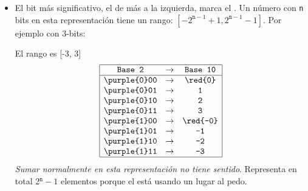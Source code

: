 \begin{itemize}[label=\iconTeoriaUno]
\begin{itemize}[label=\iconTeoriaDos]
          \item \sigMag\par
                El bit más significativo, el de más a la izquierda, marca el .
                Un número con \texttt{n} bits en esta representación tiene un rango: $[-2^{\texttt{n}-1}+1, 2^{\texttt{n}-1} - 1]$.
                Por ejemplo con 3-bits:\par
                El rango es [-3, 3]
                $$
                  \begin{array}{|ccc|}
                    \hline
                    \texttt{Base 2}       & \to & \texttt{Base 10}  \\
                    \hline
                    \texttt{\purple{0}00} & \to & \texttt{\red{0}}  \\
                    \texttt{\purple{0}01} & \to & \texttt{1}        \\
                    \texttt{\purple{0}10} & \to & \texttt{2}        \\
                    \texttt{\purple{0}11} & \to & \texttt{3}        \\
                    \texttt{\purple{1}00} & \to & \texttt{\red{-0}} \\
                    \texttt{\purple{1}01} & \to & \texttt{-1}       \\
                    \texttt{\purple{1}10} & \to & \texttt{-2}       \\
                    \texttt{\purple{1}11} & \to & \texttt{-3}       \\
                    \hline
                  \end{array}
                $$
                \textit{Sumar normalmente en esta representación no tiene sentido}. Representa en total 2$^\texttt{n} - 1$ elementos
                porque el  está usando un lugar al pedo.


\end{itemize}
\end{itemize}
